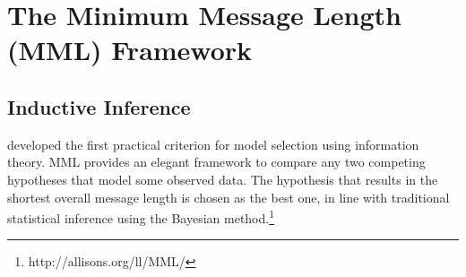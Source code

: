 \documentclass[wcp]{jmlr}
\begin{document}

\section{The Minimum Message Length (MML) Framework}
\subsection{Inductive Inference}
\citet{wallace68} developed the first practical criterion for model selection using 
information theory. MML provides an elegant framework to compare any two competing 
hypotheses that model some observed data. The hypothesis that results in the shortest 
overall message length is chosen as the best one, in line with traditional statistical 
inference using the Bayesian method.\footnote{http://allisons.org/ll/MML/} \\
\end{document}
